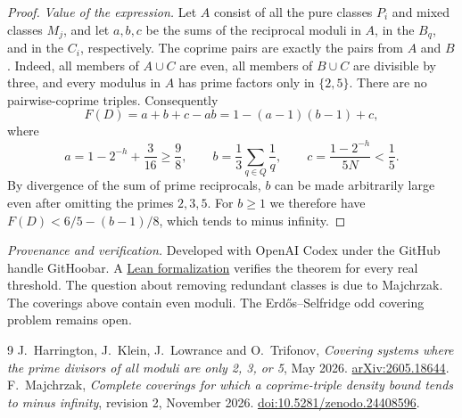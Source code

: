 \documentclass[11pt]{article}
\begin{document}
\begin{proof}
\emph{Value of the expression.} Let \(A\) consist of all the pure classes
\(P_i\) and mixed classes \(M_j\), and let \(a,b,c\) be the sums of the reciprocal
moduli in \(A\), in the \(B_q\), and in the \(C_i\), respectively. The
coprime pairs are exactly the pairs from \(A\) and \(B\). Indeed, all
members of \(A\cup C\) are even, all members of \(B\cup C\) are divisible
by three, and every modulus in \(A\) has prime factors only in \(\{2,5\}\).
There are no pairwise-coprime triples. Consequently
\[
 F(D)=a+b+c-ab=1-(a-1)(b-1)+c,
\]
where
\[
 a=1-2^{-h}+\frac{3}{16}\ge\frac98,\qquad
 b=\frac13\sum_{q\in Q}\frac1q,\qquad
 c=\frac{1-2^{-h}}{5N}<\frac15 .
\]
By divergence of the sum of prime reciprocals, \(b\) can be made
arbitrarily large even after omitting the primes \(2,3,5\). For \(b\ge1\)
we therefore have \(F(D)<6/5-(b-1)/8\), which tends to minus infinity.
\end{proof}

\smallskip
\noindent\textit{Provenance and verification.} Developed with OpenAI Codex under
the GitHub handle GitHoobar. A
\href{https://github.com/GitHoobar/open-math-agents/blob/research/erdos-7/research/erdos-7/irredundant/IrredundantMain.lean}{Lean formalization}
verifies the theorem for every real threshold. The question about removing
redundant classes is due to Majchrzak. The coverings above contain even
moduli. The Erd\H{o}s--Selfridge odd covering problem remains open.

\begin{thebibliography}{9}
 J.~Harrington, J.~Klein, J.~Lowrance and O.~Trifonov,
\emph{Covering systems where the prime divisors of all moduli are only 2, 3, or 5},
May 2026. \href{https://arxiv.org/abs/2605.18644}{arXiv:2605.18644}.
 F.~Majchrzak, \emph{Complete coverings for which a coprime-triple
density bound tends to minus infinity}, revision 2, November 2026.
\href{https://doi.org/10.5281/zenodo.24408596}{doi:10.5281/zenodo.24408596}.
\end{thebibliography}
\end{document}
